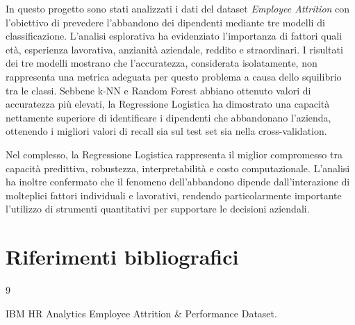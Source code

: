 \documentclass[11pt,a4paper]{article}
\begin{document}
In questo progetto sono stati analizzati i dati del dataset \emph{Employee Attrition} con l'obiettivo di prevedere l'abbandono dei dipendenti mediante tre modelli di classificazione. L'analisi esplorativa ha evidenziato l'importanza di fattori quali et\`{a}, esperienza lavorativa, anzianit\`{a} aziendale, reddito e straordinari. I risultati dei tre modelli mostrano che l'accuratezza, considerata isolatamente, non rappresenta una metrica adeguata per questo problema a causa dello squilibrio tra le classi. Sebbene k-NN e Random Forest abbiano ottenuto valori di accuratezza pi\`{u} elevati, la Regressione Logistica ha dimostrato una capacit\`{a} nettamente superiore di identificare i dipendenti che abbandonano l'azienda, ottenendo i migliori valori di recall sia sul test set sia nella cross-validation.

Nel complesso, la Regressione Logistica rappresenta il miglior compromesso tra capacit\`{a} predittiva, robustezza, interpretabilit\`{a} e costo computazionale. L'analisi ha inoltre confermato che il fenomeno dell'abbandono dipende dall'interazione di molteplici fattori individuali e lavorativi, rendendo particolarmente importante l'utilizzo di strumenti quantitativi per supportare le decisioni aziendali.


\section{Riferimenti bibliografici}

\begin{thebibliography}{9}

    IBM HR Analytics Employee Attrition \& Performance Dataset.


\end{thebibliography}
\end{document}
